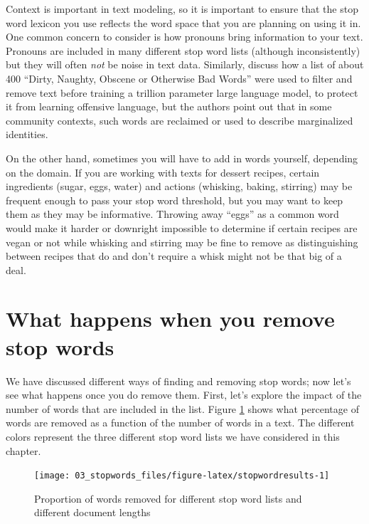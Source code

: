 \documentclass[
]{krantz}
\begin{document}
Context is important in text modeling, so it is important to ensure that the stop word lexicon you use reflects the word space that you are planning on using it in. One common concern to consider is how pronouns bring information to your text. Pronouns are included in many different stop word lists (although inconsistently) but they will often \emph{not} be noise in text data. Similarly, \citet{Bender2021} discuss how a list of about 400 ``Dirty, Naughty, Obscene or Otherwise Bad Words'' were used to filter and remove text before training a trillion parameter large language model, to protect it from learning offensive language, but the authors point out that in some community contexts, such words are reclaimed or used to describe marginalized identities.

On the other hand, sometimes you will have to add in words yourself, depending on the domain. If you are working with texts for dessert recipes, certain ingredients (sugar, eggs, water) and actions (whisking, baking, stirring) may be frequent enough to pass your stop word threshold, but you may want to keep them as they may be informative. Throwing away ``eggs'' as a common word would make it harder or downright impossible to determine if certain recipes are vegan or not while whisking and stirring may be fine to remove as distinguishing between recipes that do and don't require a whisk might not be that big of a deal.

\hypertarget{what-happens-when-you-remove-stop-words}{%
\section{What happens when you remove stop words}\label{what-happens-when-you-remove-stop-words}}

We have discussed different ways of finding and removing stop words; now let's see what happens once you do remove them. First, let's explore the impact of the number of words that are included in the list. Figure \ref{fig:stopwordresults} shows what percentage of words are removed as a function of the number of words in a text. The different colors represent the three different stop word lists we have considered in this chapter.

\begin{figure}

{\centering \texttt{[image: 03\_stopwords\_files/figure-latex/stopwordresults-1]} 

}

\caption{Proportion of words removed for different stop word lists and different document lengths}\label{fig:stopwordresults}
\end{figure}
\end{document}
